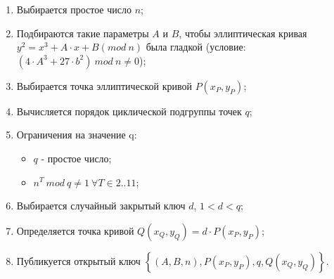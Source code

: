 \begin{enumerate}
\item Выбирается простое число $n$;
\item Подбираются такие параметры $A$ и $B$, чтобы эллиптическая кривая \\
$y^2 = x^3 + A \cdot x + B (mod \ n)$ была гладкой
(условие: $(4 \cdot A^3 + 27 \cdot b^2) \ mod \ n \neq 0$);

\item Выбирается точка эллиптической кривой $P(x_P, y_P)$;
\item Вычисляется порядок циклической подгруппы точек $q$;
\item Ограничения на значение q:
    \begin{itemize}
        \item $q$ - простое число;
        \item $n^T \ mod \ q \neq 1 \ \forall T \in 2..11$;
    \end{itemize}
\item Выбирается случайный закрытый ключ $d$, $1< d < q$;
\item Определяется точка кривой $Q(x_Q, y_Q) = d \cdot P(x_P, y_P)$;
\item Публикуется открытый ключ $\left\{(A, B, n), P(x_P, y_P), q, Q(x_Q, y_Q)\right\}$.
\end{enumerate}